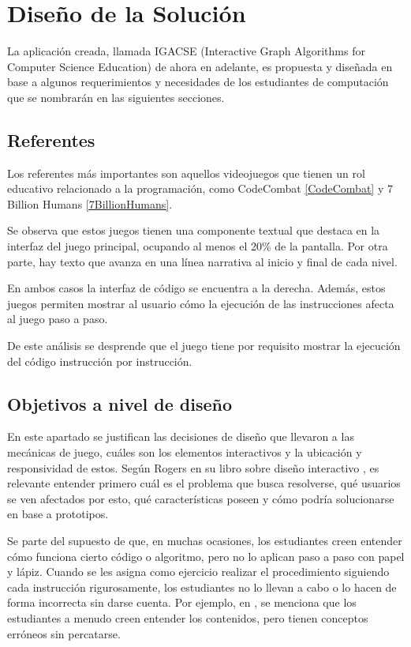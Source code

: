 \chapter{Diseño de la Solución}

La aplicación creada, llamada IGACSE (Interactive Graph Algorithms for Computer Science Education) de ahora en adelante, es propuesta y diseñada en base a algunos requerimientos y necesidades de los estudiantes de computación que se nombrarán en las siguientes secciones.

\section{Referentes}

Los referentes más importantes son aquellos videojuegos que tienen un rol educativo relacionado a la programación, como CodeCombat \ref{CodeCombat} y 7 Billion Humans \ref{7BillionHumans}.

Se observa que estos juegos tienen una componente textual que destaca en la interfaz del juego principal, ocupando al menos el 20\% de la pantalla. Por otra parte, hay texto que avanza en una línea narrativa al inicio y final de cada nivel.

En ambos casos la interfaz de código se encuentra a la derecha. Además, estos juegos permiten mostrar al usuario cómo la ejecución de las instrucciones afecta al juego paso a paso.

De este análisis se desprende que el juego tiene por requisito mostrar la ejecución del código instrucción por instrucción.

\section{Objetivos a nivel de diseño}

En este apartado se justifican las decisiones de diseño que llevaron a las mecánicas de juego, cuáles son los elementos interactivos y la ubicación y responsividad de estos. Según Rogers en su libro sobre diseño interactivo \cite{Rogers2002InteractionDesign}, es relevante entender primero cuál es el problema que busca resolverse, qué usuarios se ven afectados por esto, qué características poseen y cómo podría solucionarse en base a prototipos.

Se parte del supuesto de que, en muchas ocasiones, los estudiantes creen entender cómo funciona cierto código o algoritmo, pero no lo aplican paso a paso con papel y lápiz. Cuando se les asigna como ejercicio realizar el procedimiento siguiendo cada instrucción rigurosamente, los estudiantes no lo llevan a cabo o lo hacen de forma incorrecta sin darse cuenta. Por ejemplo, en \cite{IdentifyingStudentDifficultiesDataStructures}, se menciona que los estudiantes a menudo creen entender los contenidos, pero tienen conceptos erróneos sin percatarse.

